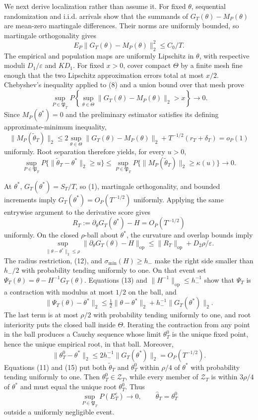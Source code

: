 We next derive localization rather than assume it. For fixed \(\theta\), sequential randomization and i.i.d. arrivals show that the summands of \(G_T(\theta)-M_P(\theta)\) are mean-zero martingale differences. Their norms are uniformly bounded, so martingale orthogonality gives
\[
 E_P\|G_T(\theta)-M_P(\theta)\|_2^2\le C_0/T. \tag{8}
\]
The empirical and population maps are uniformly Lipschitz in \(\theta\), with respective moduli \(D_1/\varepsilon\) and \(KD_1\). For fixed \(x>0\), cover compact \(\Theta\) by a finite mesh fine enough that the two Lipschitz approximation errors total at most \(x/2\). Chebyshev's inequality applied to (8) and a union bound over that mesh prove
\[
 \sup_{P\in\mathfrak P_T}P\left\{\sup_{\theta\in\Theta}
 \|G_T(\theta)-M_P(\theta)\|_2>x\right\}\longrightarrow0. \tag{9}
\]
Since \(M_P(\theta^*)=0\) and the preliminary estimator satisfies its defining approximate-minimum inequality,
\[
 \|M_P(\widetilde\theta_T)\|_2
 \le2\sup_{\theta\in\Theta}\|G_T(\theta)-M_P(\theta)\|_2
 +T^{-1/2}(r_T+\delta_T)=o_P(1) \tag{10}
\]
uniformly. Root separation therefore yields, for every \(u>0\),
\[
 \sup_{P\in\mathfrak P_T}P\{\|\widetilde\theta_T-\theta^*\|_2\ge u\}
 \le\sup_{P\in\mathfrak P_T}P\{\|M_P(\widetilde\theta_T)\|_2\ge\kappa(u)\}
 \longrightarrow0. \tag{11}
\]

At \(\theta^*\), \(G_T(\theta^*)=S_T/T\), so (1), martingale orthogonality, and bounded increments imply \(G_T(\theta^*)=O_P(T^{-1/2})\) uniformly. Applying the same entrywise argument to the derivative score gives
\[
 R_T:=\partial_\theta G_T(\theta^*)-H=O_P(T^{-1/2}) \tag{12}
\]
uniformly. On the closed \(\rho\)-ball about \(\theta^*\), the curvature and overlap bounds imply
\[
 \sup_{\|\theta-\theta^*\|_2\le\rho}
 \|\partial_\theta G_T(\theta)-H\|_{\mathrm{op}}
 \le\|R_T\|_{\mathrm{op}}+D_2\rho/\varepsilon. \tag{13}
\]
The radius restriction, (12), and \(\sigma_{\min}(H)\ge h_-\) make the right side smaller than \(h_-/2\) with probability tending uniformly to one. On that event set \(\Psi_T(\theta)=\theta-H^{-1}G_T(\theta)\). Equations (13) and \(\|H^{-1}\|_{\mathrm{op}}\le h_-^{-1}\) show that \(\Psi_T\) is a contraction with modulus at most \(1/2\) on the ball, and
\[
 \|\Psi_T(\theta)-\theta^*\|_2
 \le\tfrac12\|\theta-\theta^*\|_2+h_-^{-1}\|G_T(\theta^*)\|_2. \tag{14}
\]
The last term is at most \(\rho/2\) with probability tending uniformly to one, and root interiority puts the closed ball inside \(\Theta\). Iterating the contraction from any point in the ball produces a Cauchy sequence whose limit \(\theta_T^0\) is the unique fixed point, hence the unique empirical root, in that ball. Moreover,
\[
 \|\theta_T^0-\theta^*\|_2
 \le2h_-^{-1}\|G_T(\theta^*)\|_2=O_P(T^{-1/2}). \tag{15}
\]
Equations (11) and (15) put both \(\widetilde\theta_T\) and \(\theta_T^0\) within \(\rho/4\) of \(\theta^*\) with probability tending uniformly to one. Then \(\theta_T^0\in\mathcal Z_T\), while every member of \(\mathcal Z_T\) is within \(3\rho/4\) of \(\theta^*\) and must equal the unique root \(\theta_T^0\). Thus
\[
 \sup_{P\in\mathfrak P_T}P(E_T^c)\to0,
 \qquad \widehat\theta_T=\theta_T^0
\]
outside a uniformly negligible event.

